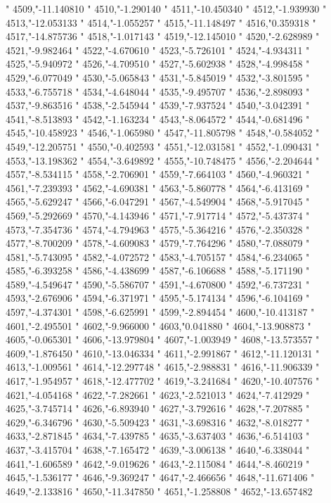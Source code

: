"
4509,"-11.140810
"
4510,"-1.290140
"
4511,"-10.450340
"
4512,"-1.939930
"
4513,"-12.053133
"
4514,"-1.055257
"
4515,"-11.148497
"
4516,"0.359318
"
4517,"-14.875736
"
4518,"-1.017143
"
4519,"-12.145010
"
4520,"-2.628989
"
4521,"-9.982464
"
4522,"-4.670610
"
4523,"-5.726101
"
4524,"-4.934311
"
4525,"-5.940972
"
4526,"-4.709510
"
4527,"-5.602938
"
4528,"-4.998458
"
4529,"-6.077049
"
4530,"-5.065843
"
4531,"-5.845019
"
4532,"-3.801595
"
4533,"-6.755718
"
4534,"-4.648044
"
4535,"-9.495707
"
4536,"-2.898093
"
4537,"-9.863516
"
4538,"-2.545944
"
4539,"-7.937524
"
4540,"-3.042391
"
4541,"-8.513893
"
4542,"-1.163234
"
4543,"-8.064572
"
4544,"-0.681496
"
4545,"-10.458923
"
4546,"-1.065980
"
4547,"-11.805798
"
4548,"-0.584052
"
4549,"-12.205751
"
4550,"-0.402593
"
4551,"-12.031581
"
4552,"-1.090431
"
4553,"-13.198362
"
4554,"-3.649892
"
4555,"-10.748475
"
4556,"-2.204644
"
4557,"-8.534115
"
4558,"-2.706901
"
4559,"-7.664103
"
4560,"-4.960321
"
4561,"-7.239393
"
4562,"-4.690381
"
4563,"-5.860778
"
4564,"-6.413169
"
4565,"-5.629247
"
4566,"-6.047291
"
4567,"-4.549904
"
4568,"-5.917045
"
4569,"-5.292669
"
4570,"-4.143946
"
4571,"-7.917714
"
4572,"-5.437374
"
4573,"-7.354736
"
4574,"-4.794963
"
4575,"-5.364216
"
4576,"-2.350328
"
4577,"-8.700209
"
4578,"-4.609083
"
4579,"-7.764296
"
4580,"-7.088079
"
4581,"-5.743095
"
4582,"-4.072572
"
4583,"-4.705157
"
4584,"-6.234065
"
4585,"-6.393258
"
4586,"-4.438699
"
4587,"-6.106688
"
4588,"-5.171190
"
4589,"-4.549647
"
4590,"-5.586707
"
4591,"-4.670800
"
4592,"-6.737231
"
4593,"-2.676906
"
4594,"-6.371971
"
4595,"-5.174134
"
4596,"-6.104169
"
4597,"-4.374301
"
4598,"-6.625991
"
4599,"-2.894454
"
4600,"-10.413187
"
4601,"-2.495501
"
4602,"-9.966000
"
4603,"0.041880
"
4604,"-13.908873
"
4605,"-0.065301
"
4606,"-13.979804
"
4607,"-1.003949
"
4608,"-13.573557
"
4609,"-1.876450
"
4610,"-13.046334
"
4611,"-2.991867
"
4612,"-11.120131
"
4613,"-1.009561
"
4614,"-12.297748
"
4615,"-2.988831
"
4616,"-11.906339
"
4617,"-1.954957
"
4618,"-12.477702
"
4619,"-3.241684
"
4620,"-10.407576
"
4621,"-4.054168
"
4622,"-7.282661
"
4623,"-2.521013
"
4624,"-7.412929
"
4625,"-3.745714
"
4626,"-6.893940
"
4627,"-3.792616
"
4628,"-7.207885
"
4629,"-6.346796
"
4630,"-5.509423
"
4631,"-3.698316
"
4632,"-8.018277
"
4633,"-2.871845
"
4634,"-7.439785
"
4635,"-3.637403
"
4636,"-6.514103
"
4637,"-3.415704
"
4638,"-7.165472
"
4639,"-3.006138
"
4640,"-6.338044
"
4641,"-1.606589
"
4642,"-9.019626
"
4643,"-2.115084
"
4644,"-8.460219
"
4645,"-1.536177
"
4646,"-9.369247
"
4647,"-2.466656
"
4648,"-11.671406
"
4649,"-2.133816
"
4650,"-11.347850
"
4651,"-1.258808
"
4652,"-13.657482
